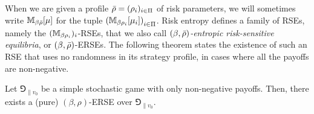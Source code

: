 When we are given a profile ${\bar{\rho}} = (\rho_i)_{i \in \Pi}$ of risk parameters, we will sometimes write $\mathbb{M}_{\beta{\bar{\rho}}}[\mu]$ for the tuple $\left(\mathbb{M}_{\beta\rho_i}[\mu_i]\right)_{i \in \Pi}$.
Risk entropy defines a family of RSEs, namely the $(\mathbb{M}_{\beta\rho_i})_i$-RSEs, that we also call \emph{$(\beta, {\bar{\rho}})$-entropic risk-sensitive equilibria}, or $(\beta, {\bar{\rho}})$-ERSEs.
The following theorem states the existence of such an RSE that uses no randomness in its strategy profile, in cases where all the payoffs are non-negative. 

\begin{theorem}\label{thm:existanceRSE}
    Let $\Game_{\|v_0}$ be a simple stochastic game with only non-negative payoffs.
    Then, there exists a (pure) $(\beta,\rho)$-ERSE over $\Game_{\|v_0}$.
\end{theorem}

